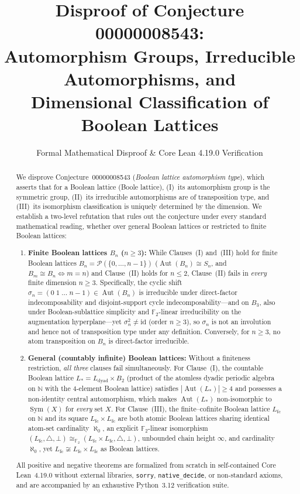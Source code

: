 \documentclass[11pt]{article}
\title{\textbf{Disproof of Conjecture 00000008543:\\
Automorphism Groups, Irreducible Automorphisms, and\\
Dimensional Classification of Boolean Lattices}}
\author{Formal Mathematical Disproof \& Core Lean 4.19.0 Verification}
\date{}
\theoremstyle{definition}
\theoremstyle{remark}
\newcommand{\Aut}{\operatorname{Aut}}
\newcommand{\Sym}{\operatorname{Sym}}
\newcommand{\id}{\mathrm{id}}
\newcommand{\Ftwo}{\mathbb{F}_2}
\newcommand{\N}{\mathbb{N}}
\newcommand{\Ldyad}{L_{\mathrm{dyad}}}
\newcommand{\Lfc}{L_{\mathrm{fc}}}
\begin{document}
\maketitle

\begin{abstract}
We disprove Conjecture~00000008543 (\emph{Boolean lattice automorphism type}), which asserts that for a Boolean lattice (Boole lattice), (I)~its automorphism group is the symmetric group, (II)~its irreducible automorphisms are of transposition type, and (III)~its isomorphism classification is uniquely determined by the dimension. We establish a two-level refutation that rules out the conjecture under every standard mathematical reading, whether over general Boolean lattices or restricted to finite Boolean lattices:
\begin{enumerate}
  \item \textbf{Finite Boolean lattices $B_n$ ($n \ge 3$):} While Clauses~(I) and~(III) hold for finite Boolean lattices $B_n = \mathcal{P}(\{0,\dots,n-1\})$ ($\Aut(B_n) \cong S_n$, and $B_m \cong B_n \iff m = n$) and Clause~(II) holds for $n \le 2$, Clause~(II) fails in \emph{every} finite dimension $n \ge 3$. Specifically, the cyclic shift $\sigma_n = (0\;1\;\dots\;n-1) \in \Aut(B_n)$ is irreducible under direct-factor indecomposability and disjoint-support cycle indecomposability---and on $B_3$, also under Boolean-sublattice simplicity and $\Ftwo$-linear irreducibility on the augmentation hyperplane---yet $\sigma_n^2 \neq \id$ (order $n \ge 3$), so $\sigma_n$ is not an involution and hence not of transposition type under any definition. Conversely, for $n \ge 3$, no atom transposition on $B_n$ is direct-factor irreducible.
  \item \textbf{General (countably infinite) Boolean lattices:} Without a finiteness restriction, \emph{all three} clauses fail simultaneously. For Clause~(I), the countable Boolean lattice $L_* = \Ldyad \times B_2$ (product of the atomless dyadic periodic algebra on $\N$ with the $4$-element Boolean lattice) satisfies $|\Aut(L_*)| \ge 4$ and possesses a non-identity central automorphism, which makes $\Aut(L_*)$ non-isomorphic to $\Sym(X)$ for \emph{every} set $X$. For Clause~(III), the finite--cofinite Boolean lattice $\Lfc$ on $\N$ and its square $\Lfc \times \Lfc$ are both atomic Boolean lattices sharing identical atom-set cardinality $\aleph_0$, an explicit $\Ftwo$-linear isomorphism $(\Lfc, \triangle, \bot) \cong_{\Ftwo} (\Lfc \times \Lfc, \triangle, \bot)$, unbounded chain height $\infty$, and cardinality $\aleph_0$, yet $\Lfc \not\cong \Lfc \times \Lfc$ as Boolean lattices.
\end{enumerate}
All positive and negative theorems are formalized from scratch in self-contained Core Lean~4.19.0 without external libraries, \texttt{sorry}, \texttt{native\_decide}, or non-standard axioms, and are accompanied by an exhaustive Python~3.12 verification suite.
\end{abstract}
\end{document}
